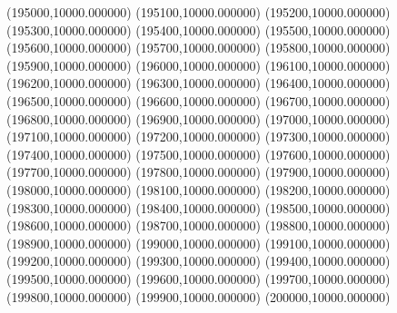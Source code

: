 (195000,10000.000000)
(195100,10000.000000)
(195200,10000.000000)
(195300,10000.000000)
(195400,10000.000000)
(195500,10000.000000)
(195600,10000.000000)
(195700,10000.000000)
(195800,10000.000000)
(195900,10000.000000)
(196000,10000.000000)
(196100,10000.000000)
(196200,10000.000000)
(196300,10000.000000)
(196400,10000.000000)
(196500,10000.000000)
(196600,10000.000000)
(196700,10000.000000)
(196800,10000.000000)
(196900,10000.000000)
(197000,10000.000000)
(197100,10000.000000)
(197200,10000.000000)
(197300,10000.000000)
(197400,10000.000000)
(197500,10000.000000)
(197600,10000.000000)
(197700,10000.000000)
(197800,10000.000000)
(197900,10000.000000)
(198000,10000.000000)
(198100,10000.000000)
(198200,10000.000000)
(198300,10000.000000)
(198400,10000.000000)
(198500,10000.000000)
(198600,10000.000000)
(198700,10000.000000)
(198800,10000.000000)
(198900,10000.000000)
(199000,10000.000000)
(199100,10000.000000)
(199200,10000.000000)
(199300,10000.000000)
(199400,10000.000000)
(199500,10000.000000)
(199600,10000.000000)
(199700,10000.000000)
(199800,10000.000000)
(199900,10000.000000)
(200000,10000.000000)
